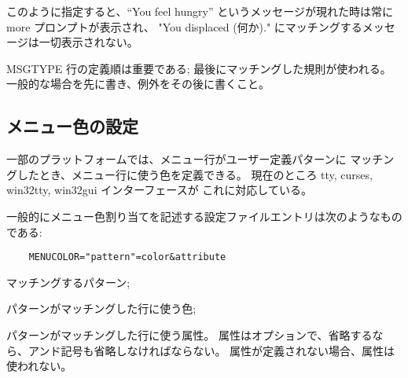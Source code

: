 このように指定すると、``You feel hungry'' というメッセージが現れた時は常に
more プロンプトが表示され、
"You displaced (何か)." にマッチングするメッセージは一切表示されない。

MSGTYPE 行の定義順は重要である; 最後にマッチングした規則が使われる。
一般的な場合を先に書き、例外をその後に書くこと。


\subsection*{メニュー色の設定}

一部のプラットフォームでは、メニュー行がユーザー定義パターンに
マッチングしたとき、メニュー行に使う色を定義できる。
現在のところ tty, curses, win32tty, win32gui インターフェースが
これに対応している。

一般的にメニュー色割り当てを記述する設定ファイルエントリは次のようなものである:
\begin{verbatim}
    MENUCOLOR="pattern"=color&attribute
\end{verbatim}

\blist{}
\item[\ib{pattern}]
マッチングするパターン;
\item[\ib{color}]
パターンがマッチングした行に使う色;
\item[\ib{attribute}]
パターンがマッチングした行に使う属性。
属性はオプションで、省略するなら、アンド記号も省略しなければならない。
属性が定義されない場合、属性は使われない。
\elist


